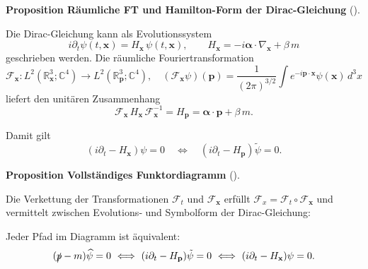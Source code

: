 \documentclass[10pt, letterpaper]{article}
\newcommand{\R}{\mathbb{R}}
\newcommand{\C}{\mathbb{C}}
\newcommand{\CustomHeading}[3]{%
  \par\medskip\noindent%
  \textbf{#1 #2} \textnormal{(#3)}.\enskip%
}
\newenvironment{PROP}[2]{\begin{unitbox}\CustomHeading{Proposition}{#1}{#2}}{\end{unitbox}}
\begin{document}
\begin{PROP}{Räumliche FT und Hamilton-Form der Dirac-Gleichung}{}
Die Dirac-Gleichung kann als Evolutionssystem
\[
i\partial_t\psi(t,\mathbf{x}) = H_{\mathbf{x}}\,\psi(t,\mathbf{x}),\qquad
H_{\mathbf{x}}=-i\boldsymbol{\alpha}\!\cdot\!\nabla_{\mathbf{x}}+\beta\,m
\]
geschrieben werden.
Die räumliche Fouriertransformation
\[
\mathcal{F}_{\mathbf{x}}:L^2(\R^3_{\mathbf{x}};\C^4)\to L^2(\R^3_{\mathbf{p}};\C^4),\quad
(\mathcal{F}_{\mathbf{x}}\psi)(\mathbf{p})
=\frac{1}{(2\pi)^{3/2}}\int e^{-i\mathbf{p}\cdot\mathbf{x}}\psi(\mathbf{x})\,d^3x
\]
liefert den unitären Zusammenhang
\[
\mathcal{F}_{\mathbf{x}}\,H_{\mathbf{x}}\,\mathcal{F}_{\mathbf{x}}^{-1}
=H_{\mathbf{p}}=\boldsymbol{\alpha}\!\cdot\!\mathbf{p}+\beta\,m.
\]

\begin{center}
\end{center}

Damit gilt
\[
(i\partial_t-H_{\mathbf{x}})\psi=0
\quad\Longleftrightarrow\quad
(i\partial_t-H_{\mathbf{p}})\tilde\psi=0.
\]
\end{PROP}




\begin{PROP}{Vollständiges Funktordiagramm}{}
Die Verkettung der Transformationen $\mathcal{F}_t$ und $\mathcal{F}_{\mathbf{x}}$ erfüllt
$\mathcal{F}_{x}=\mathcal{F}_{t}\circ\mathcal{F}_{\mathbf{x}}$ und vermittelt zwischen Evolutions‐
und Symbolform der Dirac-Gleichung:

\begin{center}
\end{center}

Jeder Pfad im Diagramm ist äquivalent:
\[
(\slashed{p}-m)\widehat{\psi}=0
\ \Longleftrightarrow\
(i\partial_t-H_{\mathbf{p}})\tilde\psi=0
\ \Longleftrightarrow\
(i\partial_t-H_{\mathbf{x}})\psi=0.
\]
\end{PROP}
\end{document}
